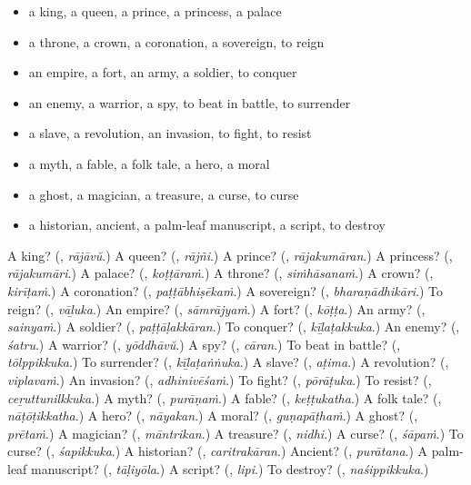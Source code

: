 \begin{itemize}
\raggedright
  \item a king, a queen, a prince, a princess, a palace
  \item a throne, a crown, a coronation, a sovereign, to reign
  \item an empire, a fort, an army, a soldier, to conquer
  \item an enemy, a warrior, a spy, to beat in battle, to surrender
  \item a slave, a revolution, an invasion, to fight, to resist
  \item a myth, a fable, a folk tale, a hero, a moral
  \item a ghost, a magician, a treasure, a curse, to curse
  \item a historian, ancient, a palm-leaf manuscript, a script, to destroy
\end{itemize}

\begin{tcolorbox}[breakable,colback=teal!4,colframe=teal!35!black,title={Before you move on}]
A king? (\textbf{}, \emph{rājāvŭ}.) A queen? (\textbf{}, \emph{rājñi}.) A prince? (\textbf{}, \emph{rājakumāran}.) A princess? (\textbf{}, \emph{rājakumāri}.) A palace? (\textbf{}, \emph{koṭṭāraṁ}.) A throne? (\textbf{}, \emph{siṁhāsanaṁ}.) A crown? (\textbf{}, \emph{kirīṭaṁ}.) A coronation? (\textbf{}, \emph{paṭṭābhiṣēkaṁ}.) A sovereign? (\textbf{}, \emph{bharaṇādhikāri}.) To reign? (\textbf{}, \emph{vāḻuka}.) An empire? (\textbf{}, \emph{sāmrājyaṁ}.) A fort? (\textbf{}, \emph{kōṭṭa}.) An army? (\textbf{}, \emph{sainyaṁ}.) A soldier? (\textbf{}, \emph{paṭṭāḷakkāran}.) To conquer? (\textbf{}, \emph{kīḻaṭakkuka}.) An enemy? (\textbf{}, \emph{śatru}.) A warrior? (\textbf{}, \emph{yōddhāvŭ}.) A spy? (\textbf{}, \emph{cāran}.) To beat in battle? (\textbf{}, \emph{tōlppikkuka}.) To surrender? (\textbf{}, \emph{kīḻaṭaṅṅuka}.) A slave? (\textbf{}, \emph{aṭima}.) A revolution? (\textbf{}, \emph{viplavaṁ}.) An invasion? (\textbf{}, \emph{adhinivēśaṁ}.) To fight? (\textbf{}, \emph{pōrāṭuka}.) To resist? (\textbf{}, \emph{ceṟuttunilkkuka}.) A myth? (\textbf{}, \emph{purāṇaṁ}.) A fable? (\textbf{}, \emph{keṭṭukatha}.) A folk tale? (\textbf{}, \emph{nāṭōṭikkatha}.) A hero? (\textbf{}, \emph{nāyakan}.) A moral? (\textbf{}, \emph{guṇapāṭhaṁ}.) A ghost? (\textbf{}, \emph{prētaṁ}.) A magician? (\textbf{}, \emph{māntrikan}.) A treasure? (\textbf{}, \emph{nidhi}.) A curse? (\textbf{}, \emph{śāpaṁ}.) To curse? (\textbf{}, \emph{śapikkuka}.) A historian? (\textbf{}, \emph{caritrakāran}.) Ancient? (\textbf{}, \emph{purātana}.) A palm-leaf manuscript? (\textbf{}, \emph{tāḷiyōla}.) A script? (\textbf{}, \emph{lipi}.) To destroy? (\textbf{}, \emph{naśippikkuka}.)
\end{tcolorbox}
